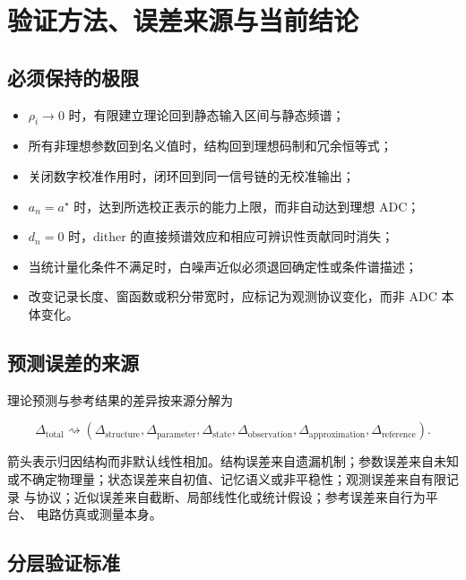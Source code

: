 \documentclass[11pt,a4paper]{ctexart}
\theoremstyle{adcplain}
\theoremstyle{definition}
\begin{document}
\section{验证方法、误差来源与当前结论}

\subsection{必须保持的极限}

\begin{itemize}
  \item $\rho_i\to0$ 时，有限建立理论回到静态输入区间与静态频谱；
  \item 所有非理想参数回到名义值时，结构回到理想码制和冗余恒等式；
  \item 关闭数字校准作用时，闭环回到同一信号链的无校准输出；
  \item $a_n=a^\star$ 时，达到所选校正表示的能力上限，而非自动达到理想 ADC；
  \item $d_n=0$ 时，dither 的直接频谱效应和相应可辨识性贡献同时消失；
  \item 当统计量化条件不满足时，白噪声近似必须退回确定性或条件谱描述；
  \item 改变记录长度、窗函数或积分带宽时，应标记为观测协议变化，而非 ADC
        本体变化。
\end{itemize}

\subsection{预测误差的来源}

理论预测与参考结果的差异按来源分解为

\begin{equation}
  \Delta_{\mathrm{total}}
  \rightsquigarrow
  \left(
  \Delta_{\mathrm{structure}},
  \Delta_{\mathrm{parameter}},
  \Delta_{\mathrm{state}},
  \Delta_{\mathrm{observation}},
  \Delta_{\mathrm{approximation}},
  \Delta_{\mathrm{reference}}
  \right).
  \label{eq:error-ledger}
\end{equation}

箭头表示归因结构而非默认线性相加。结构误差来自遗漏机制；参数误差来自未知
或不确定物理量；状态误差来自初值、记忆语义或非平稳性；观测误差来自有限记录
与协议；近似误差来自截断、局部线性化或统计假设；参考误差来自行为平台、
电路仿真或测量本身。

\subsection{分层验证标准}
\end{document}
